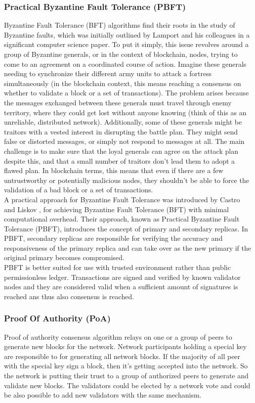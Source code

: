 \subsubsection{Practical Byzantine Fault Tolerance (PBFT)}
Byzantine Fault Tolerance (BFT) algorithms find their roots in the study of Byzantine faults, which was initially outlined by Lamport and his colleagues in a significant
computer science paper. To put it simply, this issue revolves around a group of Byzantine generals, or in the context of blockchain, nodes, trying to come to an agreement on
a coordinated course of action. Imagine these generals needing to synchronize their different army units to attack a fortress simultaneously (in the blockchain context, this
means reaching a consensus on whether to validate a block or a set of transactions).
The problem arises because the messages exchanged between these generals must travel through enemy territory, where they could get lost without anyone knowing (think of this
as an unreliable, distributed network). Additionally, some of these generals might be traitors with a vested interest in disrupting the battle plan. They might send false or
distorted messages, or simply not respond to messages at all. The main challenge is to make sure that the loyal generals can agree on the attack plan despite this, and that a
small number of traitors don't lead them to adopt a flawed plan.
In blockchain terms, this means that even if there are a few untrustworthy or potentially malicious nodes, they shouldn't be able to force the validation of a bad block or a
set of transactions.\\
A practical approach for Byzantine Fault Tolerance was introduced by Castro and Liskov \cite{castro1999practical}, for achieving Byzantine Fault Tolerance (BFT) with minimal
computational overhead. Their approach, known as Practical Byzantine Fault Tolerance (PBFT), introduces the concept of primary and secondary replicas. In PBFT, secondary
replicas are responsible for verifying the accuracy and responsiveness of the primary replica and can take over as the new primary if the original primary becomes compromised.\\
PBFT is better suited for use with trusted environment rather than public permissionless ledger. Transactions are signed and verified by known validator nodes and they are
considered valid when a sufficient amount of signatures is reached ans thus also consensus is reached.
\cite{andoni2019blockchain}

\subsubsection{Proof Of Authority (PoA)}
Proof of authority consensus algorithm relays on one or a group of peers to generate new blocks for the network. Network participants holding a special key are responsible to
for generating all network blocks. If the majority of all peer with the special key sign a block, then it's getting accepted into the network. So the network is putting their
trust to a group of authorized peers to generate and validate new blocks. The validators could be elected by a network vote and could be also possible to add new validators with
the same mechanism.
\cite{andoni2019blockchain}

